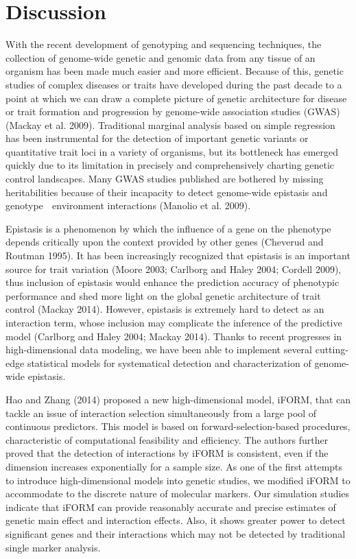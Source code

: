 \documentclass[]{book}
\theoremstyle{definition}
\theoremstyle{definition}
\theoremstyle{remark}
\begin{document}
\section{Discussion}\label{discussion}

With the recent development of genotyping and sequencing techniques, the
collection of genome-wide genetic and genomic data from any tissue of an
organism has been made much easier and more efficient. Because of this,
genetic studies of complex diseases or traits have developed during the
past decade to a point at which we can draw a complete picture of
genetic architecture for disease or trait formation and progression by
genome-wide association studies (GWAS) (Mackay et al. 2009). Traditional
marginal analysis based on simple regression has been instrumental for
the detection of important genetic variants or quantitative trait loci
in a variety of organisms, but its bottleneck has emerged quickly due to
its limitation in precisely and comprehensively charting genetic control
landscapes. Many GWAS studies published are bothered by missing
heritabilities because of their incapacity to detect genome-wide
epistasis and genotype  environment interactions (Manolio et al. 2009).

Epistasis is a phenomenon by which the influence of a gene on the
phenotype depends critically upon the context provided by other genes
(Cheverud and Routman 1995). It has been increasingly recognized that
epistasis is an important source for trait variation (Moore 2003;
Carlborg and Haley 2004; Cordell 2009), thus inclusion of epistasis
would enhance the prediction accuracy of phenotypic performance and shed
more light on the global genetic architecture of trait control (Mackay
2014). However, epistasis is extremely hard to detect as an interaction
term, whose inclusion may complicate the inference of the predictive
model (Carlborg and Haley 2004; Mackay 2014). Thanks to recent
progresses in high-dimensional data modeling, we have been able to
implement several cutting-edge statistical models for systematical
detection and characterization of genome-wide epistasis.

Hao and Zhang (2014) proposed a new high-dimensional model, iFORM, that
can tackle an issue of interaction selection simultaneously from a large
pool of continuous predictors. This model is based on
forward-selection-based procedures, characteristic of computational
feasibility and efficiency. The authors further proved that the
detection of interactions by iFORM is consistent, even if the dimension
increases exponentially for a sample size. As one of the first attempts
to introduce high-dimensional models into genetic studies, we modified
iFORM to accommodate to the discrete nature of molecular markers. Our
simulation studies indicate that iFORM can provide reasonably accurate
and precise estimates of genetic main effect and interaction effects.
Also, it shows greater power to detect significant genes and their
interactions which may not be detected by traditional single marker
analysis.
\end{document}
